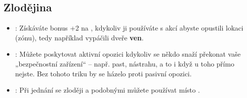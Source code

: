 \documentclass[../main.tex]{subfiles}
\begin{document}
\subsection{Zlodějina}
\label{sec:trik-zlodejina}

\begin{itemize}
\item{}:
  \label{sec:zlodejina-vratka}
  Získáváte bonus +2 na , kdykoliv ji používáte s akcí  abyste opustili lokaci (zónu), tedy například vypáčili dveře \textbf{ven}.

\item{}:
  \label{sec:zlodejina-odbornik}
  Můžete poskytovat aktivní opozici kdykoliv se někdo snaží překonat vaše „bezpečnostní zařízení“ – např. past, nástrahu, a to i když u toho přímo nejste. Bez tohoto triku by se házelo proti pasivní opozici.

\item{}:
  \label{sec:zlodejina-septani}
  Při jednání se zloději a podobnými můžete používat  místo .
\end{itemize}
  
\end{document}

